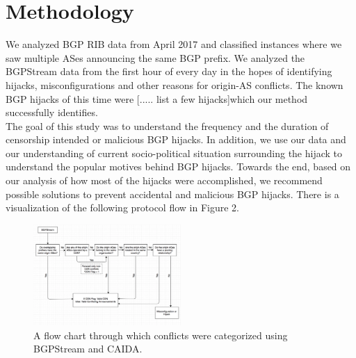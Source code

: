  \section{Methodology}\label{sec:methodology}
We analyzed BGP RIB data from April 2017 and classified instances where we saw multiple ASes announcing the same BGP prefix. We analyzed the BGPStream data from the first hour of every day in the hopes of identifying hijacks, misconfigurations and other reasons for origin-AS conflicts. The known BGP hijacks of this time were [..... list a few hijacks]which our method successfully  identifies. \\
The goal of this study was to understand the frequency and the duration of censorship intended or malicious BGP hijacks. In addition, we  use our data and our understanding of current socio-political situation surrounding the hijack to understand the popular motives behind BGP hijacks. Towards the end, based on our analysis of how most of the hijacks were accomplished, we recommend possible solutions to prevent accidental and malicious BGP hijacks. 
There is a visualization of the following protocol flow in Figure 2.

 \begin{figure}[!htbp]
	\includegraphics[width=0.5\textwidth]{flow.png}
	\caption{A flow chart through which conflicts were categorized using BGPStream and CAIDA.}
	\label{a:label}
\end{figure}

